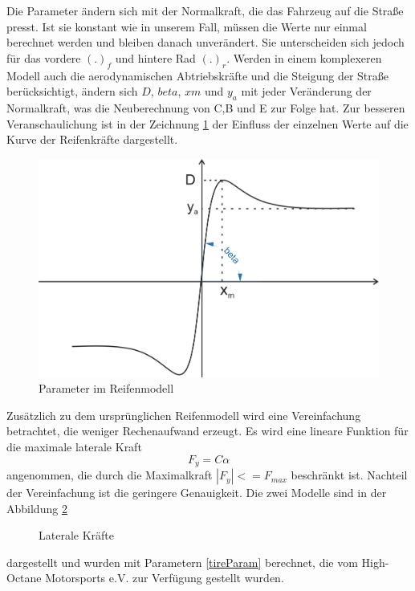 \documentclass{like}
\begin{document}
Die Parameter ändern sich mit der Normalkraft, die das Fahrzeug auf die Straße presst. Ist sie konstant wie in unserem Fall, müssen die Werte nur einmal berechnet werden und bleiben danach unverändert. Sie unterscheiden sich jedoch für das vordere $(.)_f$ und hintere Rad $(.)_r$. Werden in einem komplexeren Modell auch die aerodynamischen Abtriebskräfte und die Steigung der Straße berücksichtigt, ändern sich $D$, $beta$, $xm$ und $y_a$ mit jeder Veränderung der Normalkraft, was die Neuberechnung von C,B und E zur Folge hat. Zur besseren Veranschaulichung ist in der Zeichnung \ref{fig:tireModelParameter} der Einfluss der einzelnen Werte auf die Kurve der Reifenkräfte dargestellt. 

\begin{figure}[ht!]
	\centering
	\includegraphics[width=350pt]{Abbildungen/tireModel.png}
	\caption{Parameter im Reifenmodell}
	\label{fig:tireModelParameter}
\end{figure}
 
Zusätzlich zu dem ursprünglichen Reifenmodell wird eine Vereinfachung betrachtet, die weniger Rechenaufwand erzeugt. Es wird eine lineare Funktion für die maximale laterale Kraft
\begin{equation}
F_y = C \alpha 
\end{equation}
angenommen, die durch die Maximalkraft $|F_y| <= F_{max} $ beschränkt ist.
Nachteil der Vereinfachung ist die geringere Genauigkeit. 
Die zwei Modelle sind in der Abbildung \ref{fig:pacejka}
\begin{figure}[ht!]
	\centering
	 
	\caption{Laterale Kräfte}
	\label{fig:pacejka}
\end{figure}

dargestellt und wurden mit Parametern \ref{tireParam} berechnet, die vom High-Octane Motorsports e.V. zur Verfügung gestellt wurden.
\end{document}
